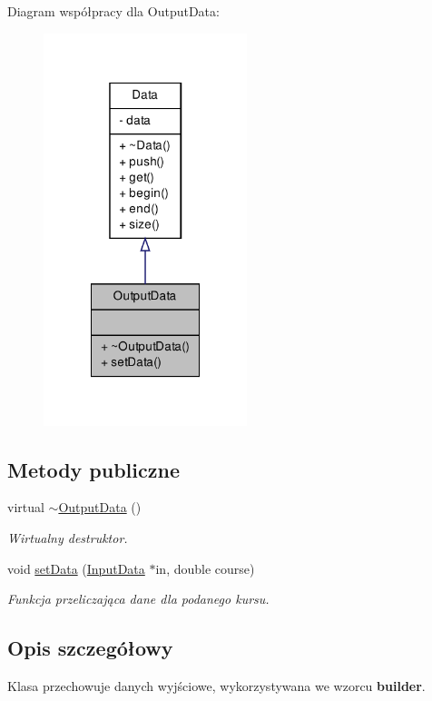 \-Diagram współpracy dla \-Output\-Data\-:\nopagebreak
\begin{figure}[H]
\begin{center}
\leavevmode
\includegraphics[width=168pt]{class_output_data__coll__graph}
\end{center}
\end{figure}
\subsection*{\-Metody publiczne}
\begin{DoxyCompactItemize}
\item 
virtual \hyperlink{class_output_data_a525bfc788d9e24559c70d27bfadc6035}{$\sim$\-Output\-Data} ()
\begin{DoxyCompactList}\small\item\em \-Wirtualny destruktor. \end{DoxyCompactList}\item 
void \hyperlink{class_output_data_a46b8027d2773c914affbb6051b625930}{set\-Data} (\hyperlink{class_input_data}{\-Input\-Data} $\ast$in, double course)
\begin{DoxyCompactList}\small\item\em \-Funkcja przeliczająca dane dla podanego kursu. \end{DoxyCompactList}\end{DoxyCompactItemize}


\subsection{\-Opis szczegółowy}
\-Klasa przechowuje danych wyjściowe, wykorzystywana we wzorcu {\bfseries builder}. 


